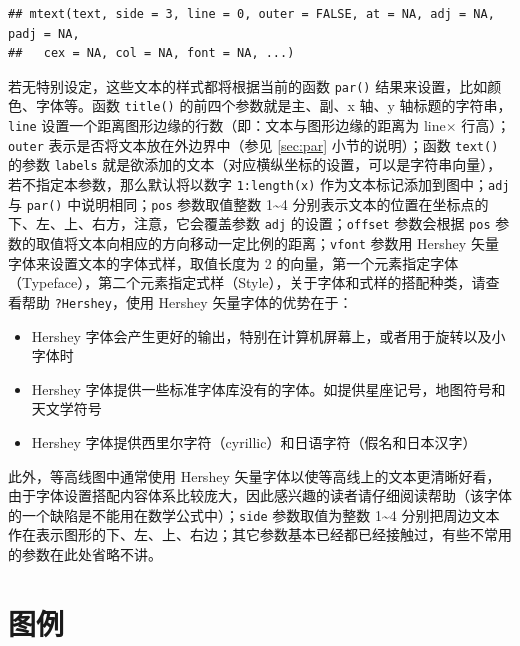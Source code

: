 \documentclass[
  b5paper,
  UTF8,twoside]{book}
\providecommand{\tightlist}{%
  \setlength{\itemsep}{0pt}\setlength{\parskip}{0pt}}
\begin{document}
\begin{verbatim}
## mtext(text, side = 3, line = 0, outer = FALSE, at = NA, adj = NA, padj = NA,
##   cex = NA, col = NA, font = NA, ...)
\end{verbatim}

若无特别设定，这些文本的样式都将根据当前的函数 \texttt{par()} 结果来设置，比如颜色、字体等。函数 \texttt{title()} 的前四个参数就是主、副、x 轴、y 轴标题的字符串，\texttt{line} 设置一个距离图形边缘的行数（即：文本与图形边缘的距离为 line\(\times\) 行高）；\texttt{outer} 表示是否将文本放在外边界中（参见 \ref{sec:par} 小节的说明）；函数 \texttt{text()} 的参数 \texttt{labels} 就是欲添加的文本（对应横纵坐标的设置，可以是字符串向量），若不指定本参数，那么默认将以数字 \texttt{1:length(x)} 作为文本标记添加到图中；\texttt{adj} 与 \texttt{par()} 中说明相同；\texttt{pos} 参数取值整数 1\textasciitilde4 分别表示文本的位置在坐标点的下、左、上、右方，注意，它会覆盖参数 \texttt{adj} 的设置；\texttt{offset} 参数会根据 \texttt{pos} 参数的取值将文本向相应的方向移动一定比例的距离；\texttt{vfont} 参数用 Hershey 矢量字体来设置文本的字体式样，取值长度为 2 的向量，第一个元素指定字体（Typeface），第二个元素指定式样（Style），关于字体和式样的搭配种类，请查看帮助 \texttt{?Hershey}，使用 Hershey 矢量字体的优势在于：

\begin{itemize}
\tightlist
\item
  Hershey 字体会产生更好的输出，特别在计算机屏幕上，或者用于旋转以及小字体时
\item
  Hershey 字体提供一些标准字体库没有的字体。如提供星座记号，地图符号和天文学符号
\item
  Hershey 字体提供西里尔字符（cyrillic）和日语字符（假名和日本汉字）
\end{itemize}

此外，等高线图中通常使用 Hershey 矢量字体以使等高线上的文本更清晰好看，由于字体设置搭配内容体系比较庞大，因此感兴趣的读者请仔细阅读帮助（该字体的一个缺陷是不能用在数学公式中）；\texttt{side} 参数取值为整数 1\textasciitilde4 分别把周边文本作在表示图形的下、左、上、右边；其它参数基本已经都已经接触过，有些不常用的参数在此处省略不讲。

\hypertarget{sec:legend}{%
\section{图例}\label{sec:legend}}
\end{document}
